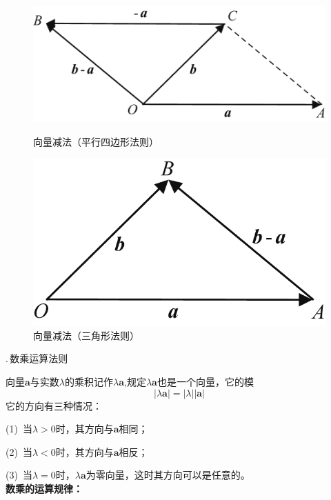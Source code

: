 \begin{figure}[h]
\centering
\begin{minipage}{0.55\linewidth}
	\centering
	\includegraphics[width = 0.8\linewidth]{pic/C-5/vecdel}
	\vspace*{-1em}
	\caption{向量减法（平行四边形法则）}
	\label{向量减法1}
\end{minipage}
\begin{minipage}{0.4\linewidth}
	\centering
	\includegraphics[width = 0.755\linewidth]{pic/C-5/vecdel2}
	\vspace*{-1em}
	\caption{向量减法（三角形法则）}
	\label{向量减法2}
\end{minipage}
\end{figure}

\newpage

.$\,$数乘运算法则


向量$\boldsymbol{a}$与实数$\lambda$的乘积记作$\lambda\boldsymbol{a}$,规定$\lambda\boldsymbol{a}$也是一个向量，它的模
\begin{equation}
	|\lambda\boldsymbol{a}|=|\lambda||\boldsymbol{a}|
\end{equation}
它的方向有三种情况：

(1)$\,$ 当$\lambda>0$时，其方向与$\boldsymbol{a}$相同；

(2)$\,$ 当$\lambda<0$时，其方向与$\boldsymbol{a}$相反；

(3)$\,$ 当$\lambda=0$时，$\lambda\boldsymbol{a}$为零向量，这时其方向可以是任意的。\\[0.5em]
\textbf{数乘的运算规律：}

